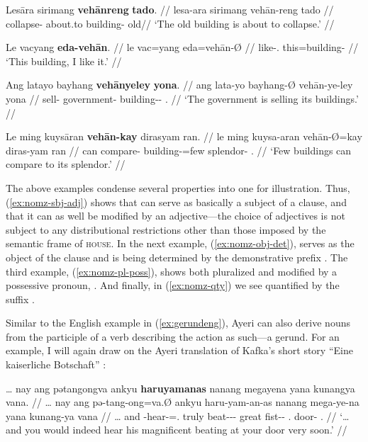 \pex
\a\label{ex:nomz-sbj-adj}\begingl
	\gla Lesāra sirimang \textbf{vehānreng} \textbf{tado}. //
	\glb lesa-ara sirimang vehān-reng tado //
	\glc collapse-\TsgI{} about.to building-\AargI{} old//
	\glft `The old building is about to collapse.' //
\endgl

\a\label{ex:nomz-obj-det}\begingl
	\gla Le vacyang \textbf{eda-vehān}. //
	\glb le vac=yang eda=vehān-Ø //
	\glc \PatTI{} like-\Fsg{}.\Aarg{} this=building-\Top{} //
	\glft `This building, I like it.' //
\endgl

\a\label{ex:nomz-pl-poss}\begingl
	\gla Ang latayo bayhang \textbf{vehānyeley} \textbf{yona}. //
	\glb ang lata-yo bayhang-Ø vehān-ye-ley yona //
	\glc \AgtT{} sell-\TsgN{} government-\Top{} 
		building-\Pl{}-\PargI{} \TsgN{}.\Gen{} //
	\glft `The government is selling its buildings.' //
\endgl

\a\label{ex:nomz-qty}\begingl
	\gla Le ming kuysāran \textbf{vehān-kay} dirasyam ran. //
	\glb le ming kuysa-aran vehān-Ø=kay diras-yam ran //
	\glc \PatTI{} can compare-\TplI{} building-\Top=few 
		splendor-\Dat{} \TsgI{}.\Gen{} //
	\glft `Few buildings can compare to its splendor.' //
\endgl
\xe

The above examples condense several properties into one for illustration. Thus,
(\ref{ex:nomz-sbj-adj}) shows that  can serve as basically
a subject of a clause, and that it can as well be modified by an 
adjective---the choice of adjectives is not subject to any distributional
restrictions other than those imposed by the semantic frame of \textsc{house}.
In the next example, (\ref{ex:nomz-obj-det}),  serves as
the object of the clause and is being determined by the demonstrative prefix 
. The third example, (\ref{ex:nomz-pl-poss}), shows 
 both pluralized and modified by a possessive pronoun, 
. And finally, in (\ref{ex:nomz-qty}) we see 
 quantified by the suffix .

Similar to the English example in (\ref{ex:gerundeng}), Ayeri can also derive
nouns from the participle of a verb describing the action as such---a gerund.
For an example, I will again draw on the Ayeri translation of Kafka's short
story \enquote{Eine kaiserliche Botschaft} \citep[2,
14]{becker:kafka:imperial}:

\ex\label{ex:kafkagerund}\begingl
	\gla … nay ang pətangongva ankyu \textbf{haruyamanas} nanang megayena 
		yana kunangya vana. //
	\glb … nay ang pə-tang-ong=va.Ø ankyu haru-yam-an-as nanang 
		mega-ye-na yana kunang-ya vana //
	\glc … and \AgtT{} \NFut{}-hear-\Irr{}=\Ssg{}.\Top{} truly 
		beat-\Ptcp{}-\Nmlz{}-\Parg{} great fist-\Pl{}-\Gen{} 
		\TsgM{}.\Gen{} door-\Loc{} \Ssg{}.\Gen{} //
	\glft `… and you would indeed hear his magnificent beating at your door 
		very soon.' //
\endgl\xe

